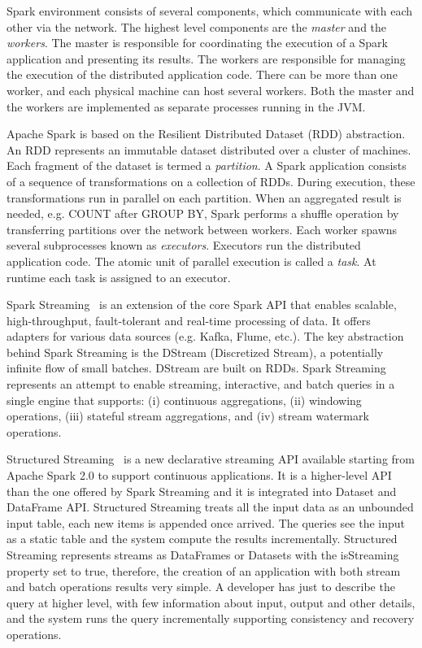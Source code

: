 Spark environment consists of several components, which communicate with each other via the network. The highest level components are the \textit{master} and the \textit{workers}. The master is responsible for coordinating the execution of a Spark application and presenting its results. The workers are responsible for managing the execution of the distributed application code. There can be more than one worker, and each physical machine can host several workers. Both the master and the workers are implemented as separate processes running in the JVM.

Apache Spark is based on the Resilient Distributed Dataset (RDD) abstraction. An RDD represents an immutable dataset distributed over a cluster of machines. Each fragment of the dataset is termed a \textit{partition}. A Spark application consists of a sequence of transformations on a collection of RDDs. During execution, these transformations run in parallel on each partition. When an aggregated result is needed, e.g. COUNT after GROUP BY, Spark performs a shuffle operation by transferring partitions over the network between workers. Each worker spawns several subprocesses known as \textit{executors}. Executors run the distributed application code. The atomic unit of parallel execution is called a \textit{task}. At runtime each task is assigned to an executor.

Spark Streaming~\cite{DBLP:conf/sosp/ZahariaDLHSS13} is an extension of the core Spark API that enables scalable, high-throughput, fault-tolerant and real-time processing of data. 
It offers adapters for various data sources (e.g. Kafka, Flume, etc.).
The key abstraction behind Spark Streaming is the DStream (Discretized Stream), a potentially infinite flow of small batches. DStream are built on RDDs.
Spark Streaming represents an attempt to enable streaming, interactive, and batch queries in a single engine that supports: (i) continuous aggregations, (ii) windowing operations, (iii) stateful stream aggregations, and (iv) stream watermark operations.

Structured Streaming~\cite{DBLP:conf/sigmod/ArmbrustDTYZX0S18} is a new declarative streaming API available starting from Apache Spark 2.0 to support continuous applications. It is a higher-level API than the one offered by Spark Streaming and it is integrated into Dataset and DataFrame API.
Structured Streaming treats all the input data as an unbounded input table, each new items is appended once arrived. The queries see the input as a static table and the system compute the results incrementally.
Structured Streaming represents streams as DataFrames or Datasets with the isStreaming property set to true, therefore, the creation of an application with both stream and batch operations results very simple. A developer has just to describe the query at higher level, with few information about input, output and other details, and the system runs the query incrementally supporting consistency and recovery operations.

